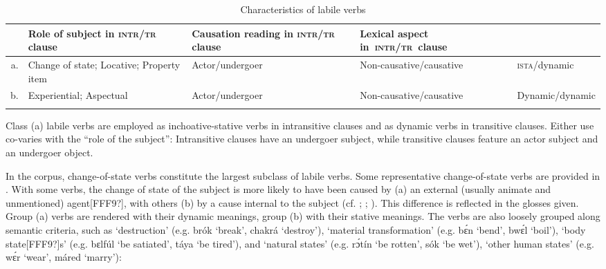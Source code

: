 \begin{table}
\caption{Characteristics of labile verbs}
\label{tab:key:9.5}
\small
\begin{tabularx}{\textwidth}{r>{\raggedright}p{24mm}p{24mm}p{29mm}Q}
\lsptoprule

 & Role of subject in \textsc{intr/tr} clause & Causation reading in \textsc{intr/tr} clause & Lexical aspect \mbox{in \textsc{intr/tr} clause}\\
\midrule
a. & Change of state; Locative; Property item& Actor/undergoer & Non-causative/causative & \textsc{ista}/dynamic\\


\tablevspace
b. & Experiential; Aspectual & Actor/undergoer & Non-causative/causative & Dynamic/dynamic\\
\lspbottomrule
\end{tabularx}
\end{table}
Class (a) labile verbs are employed as inchoative-stative verbs in intransitive clauses and as dynamic verbs in transitive clauses. Either use co-varies with the “role of the subject”: Intransitive clauses have an undergoer subject, while transitive clauses feature an actor subject and an undergoer object. 


In the corpus, change-of-state verbs constitute the largest subclass of labile verbs. Some representative change-of-state verbs are provided in . With some verbs, the change of state of the subject is more likely to have been caused by (a) an external (usually animate and unmentioned) agent[FFF9?], with others (b) by a cause internal to the subject (cf. \citealt{Croft1990}; \citealt{Haspelmath1993}; \citealt{LevinHovav1995}). This difference is reflected in the glosses given. Group (a) verbs are rendered with their dynamic meanings, group (b) with their stative meanings. The verbs are also loosely grouped along semantic criteria, such as ‘destruction’ (e.g. brók ‘break’, chakrá ‘destroy’), ‘material transformation’ (e.g. bɛ́n ‘bend’, bwɛ́l ‘boil’), ‘body state[FFF9?]s’ (e.g. bɛlfúl ‘be satiated’, táya ‘be tired’), and ‘natural states’ (e.g. rɔ́tín ‘be rotten’, sók ‘be wet’), ‘other human states’ (e.g. wɛ́r ‘wear’, máred ‘marry’):


